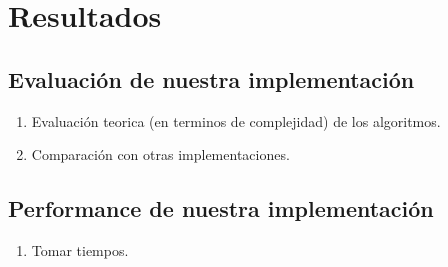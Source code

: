 \section{Resultados}

\subsection{Evaluación de nuestra implementación}

\begin{enumerate}
  \item Evaluación teorica (en terminos de complejidad) de los algoritmos.
  \item Comparación con otras implementaciones.
\end{enumerate}

\subsection{Performance de nuestra implementación}

\begin{enumerate}
  \item Tomar tiempos.
\end{enumerate}

